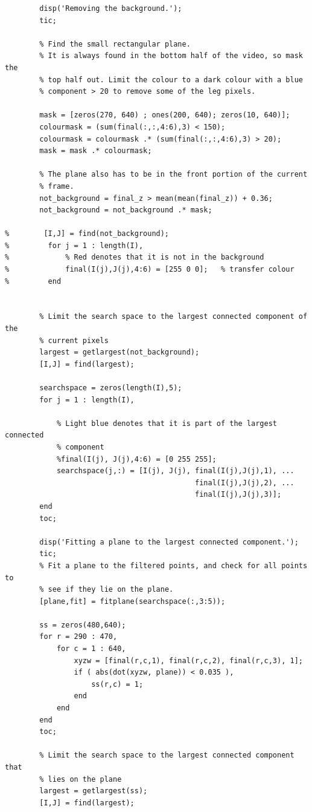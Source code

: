 \documentclass[11pt]{article}
\begin{document}
\begin{verbatim}
        disp('Removing the background.');
        tic;
        
        % Find the small rectangular plane.
        % It is always found in the bottom half of the video, so mask the
        % top half out. Limit the colour to a dark colour with a blue
        % component > 20 to remove some of the leg pixels.
        
        mask = [zeros(270, 640) ; ones(200, 640); zeros(10, 640)];
        colourmask = (sum(final(:,:,4:6),3) < 150);
        colourmask = colourmask .* (sum(final(:,:,4:6),3) > 20);
        mask = mask .* colourmask;
        
        % The plane also has to be in the front portion of the current
        % frame.
        not_background = final_z > mean(mean(final_z)) + 0.36;
        not_background = not_background .* mask;
        
%        [I,J] = find(not_background);
%         for j = 1 : length(I),
%             % Red denotes that it is not in the background
%             final(I(j),J(j),4:6) = [255 0 0];   % transfer colour
%         end
        
    
        % Limit the search space to the largest connected component of the
        % current pixels
        largest = getlargest(not_background);
        [I,J] = find(largest);

        searchspace = zeros(length(I),5);
        for j = 1 : length(I),
            
            % Light blue denotes that it is part of the largest connected
            % component
            %final(I(j), J(j),4:6) = [0 255 255];
            searchspace(j,:) = [I(j), J(j), final(I(j),J(j),1), ... 
                                            final(I(j),J(j),2), ... 
                                            final(I(j),J(j),3)];
        end
        toc;
        
        disp('Fitting a plane to the largest connected component.');
        tic;
        % Fit a plane to the filtered points, and check for all points to 
        % see if they lie on the plane.
        [plane,fit] = fitplane(searchspace(:,3:5));

        ss = zeros(480,640);
        for r = 290 : 470,
            for c = 1 : 640,
                xyzw = [final(r,c,1), final(r,c,2), final(r,c,3), 1];
                if ( abs(dot(xyzw, plane)) < 0.035 ),
                    ss(r,c) = 1;
                end
            end
        end
        toc;
        
        % Limit the search space to the largest connected component that
        % lies on the plane
        largest = getlargest(ss);
        [I,J] = find(largest);


\end{verbatim}
\end{document}
